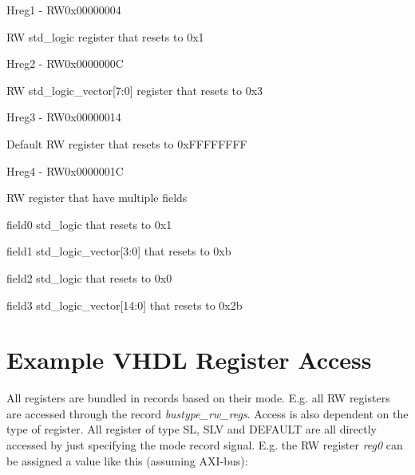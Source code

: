 \documentclass{article}
\begin{document}
\begin{register}{H}{reg1 - RW}{0x00000004}
  \par RW std{\_}logic register that resets to 0x1 \regnewline
  \label{reg1}
\regnewline
\end{register}

\begin{register}{H}{reg2 - RW}{0x0000000C}
  \par RW std{\_}logic{\_}vector[7:0] register that resets to 0x3 \regnewline
  \label{reg2}
\regnewline
\end{register}

\begin{register}{H}{reg3 - RW}{0x00000014}
  \par Default RW register that resets to 0xFFFFFFFF \regnewline
  \label{reg3}
\regnewline
\end{register}

\begin{register}{H}{reg4 - RW}{0x0000001C}
  \par RW register that have multiple fields \regnewline
  \label{reg4}
\regnewline
  \begin{regdesc}\begin{reglist}[field0]
    \item [field0] std{\_}logic that resets to 0x1    \item [field1] std{\_}logic{\_}vector[3:0] that resets to 0xb    \item [field2] std{\_}logic that resets to 0x0    \item [field3] std{\_}logic{\_}vector[14:0] that resets to 0x2b  \end{reglist}\end{regdesc}
\end{register}

\section{Example VHDL Register Access}

\par
All registers are bundled in records based on their mode. E.g. all RW registers are accessed through the record \textit{bustype\_rw\_regs}. Access is also dependent on the type of register. All register of type SL, SLV and DEFAULT are all directly accessed by just specifying the mode record signal. E.g. the RW register \textit{reg0} can be assigned a value like this (assuming AXI-bus):
\end{document}
